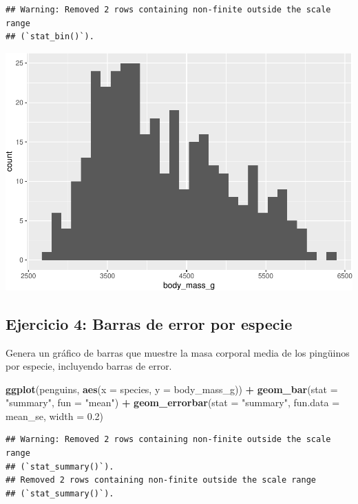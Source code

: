 \documentclass[
]{book}
\newenvironment{Shaded}{\begin{snugshade}}{\end{snugshade}}
\newcommand{\AttributeTok}[1]{\textcolor[rgb]{0.13,0.29,0.53}{#1}}
\newcommand{\FloatTok}[1]{\textcolor[rgb]{0.00,0.00,0.81}{#1}}
\newcommand{\FunctionTok}[1]{\textcolor[rgb]{0.13,0.29,0.53}{\textbf{#1}}}
\newcommand{\NormalTok}[1]{#1}
\newcommand{\SpecialCharTok}[1]{\textcolor[rgb]{0.81,0.36,0.00}{\textbf{#1}}}
\newcommand{\StringTok}[1]{\textcolor[rgb]{0.31,0.60,0.02}{#1}}
\begin{document}
\begin{verbatim}
## Warning: Removed 2 rows containing non-finite outside the scale range
## (`stat_bin()`).
\end{verbatim}

\includegraphics{bookdown-demo_files/figure-latex/unnamed-chunk-202-1.pdf}

\hypertarget{ejercicio-4-barras-de-error-por-especie-1}{%
\subsection{Ejercicio 4: Barras de error por especie}\label{ejercicio-4-barras-de-error-por-especie-1}}

Genera un gráfico de barras que muestre la masa corporal media de los pingüinos por especie, incluyendo barras de error.

\begin{Shaded}
\begin{Highlighting}[]
\FunctionTok{ggplot}\NormalTok{(penguins, }\FunctionTok{aes}\NormalTok{(}\AttributeTok{x =}\NormalTok{ species, }\AttributeTok{y =}\NormalTok{ body\_mass\_g)) }\SpecialCharTok{+}
  \FunctionTok{geom\_bar}\NormalTok{(}\AttributeTok{stat =} \StringTok{"summary"}\NormalTok{, }\AttributeTok{fun =} \StringTok{"mean"}\NormalTok{) }\SpecialCharTok{+}
  \FunctionTok{geom\_errorbar}\NormalTok{(}\AttributeTok{stat =} \StringTok{"summary"}\NormalTok{, }\AttributeTok{fun.data =}\NormalTok{ mean\_se, }\AttributeTok{width =} \FloatTok{0.2}\NormalTok{)}
\end{Highlighting}
\end{Shaded}

\begin{verbatim}
## Warning: Removed 2 rows containing non-finite outside the scale range
## (`stat_summary()`).
## Removed 2 rows containing non-finite outside the scale range
## (`stat_summary()`).
\end{verbatim}
\end{document}
